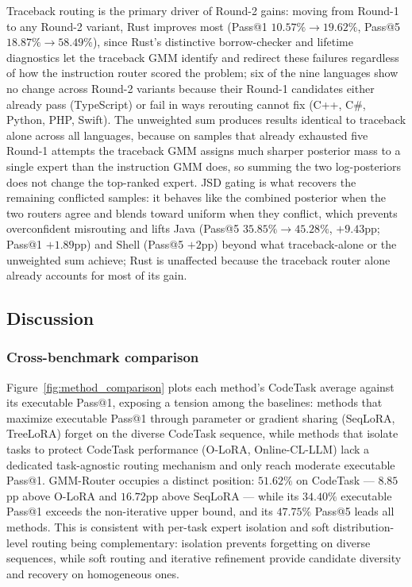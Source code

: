 Traceback routing is the primary driver of Round-2 gains: moving from Round-1 to any Round-2 variant, Rust improves most (Pass@1 $10.57\%\to19.62\%$, Pass@5 $18.87\%\to58.49\%$), since Rust's distinctive borrow-checker and lifetime diagnostics let the traceback GMM identify and redirect these failures regardless of how the instruction router scored the problem; six of the nine languages show no change across Round-2 variants because their Round-1 candidates either already pass (TypeScript) or fail in ways rerouting cannot fix (C++, C\#, Python, PHP, Swift). The unweighted sum produces results identical to traceback alone across all languages, because on samples that already exhausted five Round-1 attempts the traceback GMM assigns much sharper posterior mass to a single expert than the instruction GMM does, so summing the two log-posteriors does not change the top-ranked expert. JSD gating is what recovers the remaining conflicted samples: it behaves like the combined posterior when the two routers agree and blends toward uniform when they conflict, which prevents overconfident misrouting and lifts Java (Pass@5 $35.85\%\to45.28\%$, $+9.43$pp; Pass@1 $+1.89$pp) and Shell (Pass@5 $+2$pp) beyond what traceback-alone or the unweighted sum achieve; Rust is unaffected because the traceback router alone already accounts for most of its gain.

\subsection{Discussion}
\label{sec:discussion}

\subsubsection{Cross-benchmark comparison}
\label{sec:crossbench}

Figure~\ref{fig:method_comparison} plots each method's CodeTask average against its executable Pass@1, exposing a tension among the baselines: methods that maximize executable Pass@1 through parameter or gradient sharing (SeqLoRA, TreeLoRA) forget on the diverse CodeTask sequence, while methods that isolate tasks to protect CodeTask performance (O-LoRA, Online-CL-LLM) lack a dedicated task-agnostic routing mechanism and only reach moderate executable Pass@1. GMM-Router occupies a distinct position: $51.62\%$ on CodeTask --- $8.85$pp above O-LoRA and $16.72$pp above SeqLoRA --- while its $34.40\%$ executable Pass@1 exceeds the non-iterative upper bound, and its $47.75\%$ Pass@5 leads all methods. This is consistent with per-task expert isolation and soft distribution-level routing being complementary: isolation prevents forgetting on diverse sequences, while soft routing and iterative refinement provide candidate diversity and recovery on homogeneous ones.

